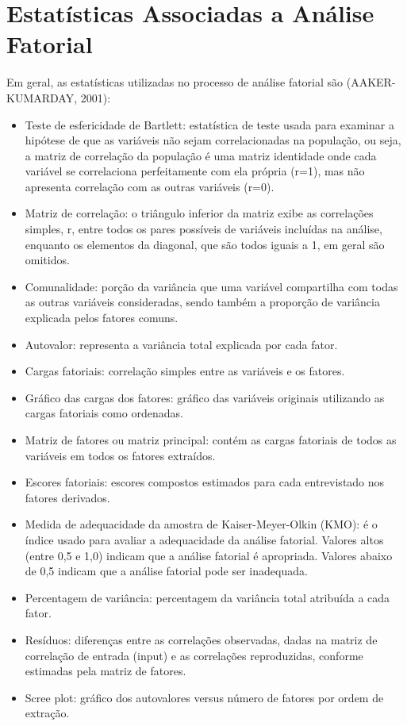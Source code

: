 \documentclass[12pt,brazil,oneside]{book}
\begin{document}
\hypertarget{estatisticas-associadas-a-analise-fatorial}{%
\section{Estatísticas Associadas a Análise Fatorial}\label{estatisticas-associadas-a-analise-fatorial}}

Em geral, as estatísticas utilizadas no processo de análise fatorial são (AAKER-KUMARDAY, 2001):

\begin{itemize}
\item
  Teste de esfericidade de Bartlett: estatística de teste usada para examinar a hipótese de que as variáveis não sejam correlacionadas na população, ou seja, a matriz de correlação da população é uma matriz identidade onde cada variável se correlaciona perfeitamente com ela própria (r=1), mas não apresenta correlação com as outras variáveis (r=0).
\item
  Matriz de correlação: o triângulo inferior da matriz exibe as correlações simples, r, entre todos os pares possíveis de variáveis incluídas na análise, enquanto os elementos da diagonal, que são todos iguais a 1, em geral são omitidos.
\item
  Comunalidade: porção da variância que uma variável compartilha com todas as outras variáveis consideradas, sendo também a proporção de variância explicada pelos fatores comuns.
\item
  Autovalor: representa a variância total explicada por cada fator.
\item
  Cargas fatoriais: correlação simples entre as variáveis e os fatores.
\item
  Gráfico das cargas dos fatores: gráfico das variáveis originais utilizando as cargas fatoriais como ordenadas.
\item
  Matriz de fatores ou matriz principal: contém as cargas fatoriais de todos as variáveis em todos os fatores extraídos.
\item
  Escores fatoriais: escores compostos estimados para cada entrevistado nos fatores derivados.
\item
  Medida de adequacidade da amostra de Kaiser-Meyer-Olkin (KMO): é o índice usado para avaliar a adequacidade da análise fatorial. Valores altos (entre 0,5 e 1,0) indicam que a análise fatorial é apropriada. Valores abaixo de 0,5 indicam que a análise fatorial pode ser inadequada.
\item
  Percentagem de variância: percentagem da variância total atribuída a cada fator.
\item
  Resíduos: diferenças entre as correlações observadas, dadas na matriz de correlação de entrada (input) e as correlações reproduzidas, conforme estimadas pela matriz de fatores.
\item
  Scree plot: gráfico dos autovalores versus número de fatores por ordem de extração.
\end{itemize}
\end{document}
